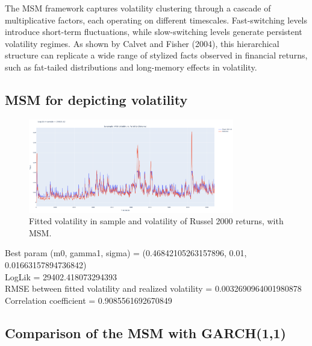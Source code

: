 \documentclass[11pt]{extarticle}
\begin{document}
The MSM framework captures volatility clustering through a cascade of multiplicative factors, each operating on different timescales. Fast-switching levels introduce short-term fluctuations, while slow-switching levels generate persistent volatility regimes. As shown by Calvet and Fisher (2004), this hierarchical structure can replicate a wide range of stylized facts observed in financial returns, such as fat-tailed distributions and long-memory effects in volatility.





\subsection{MSM for depicting volatility}

\begin{figure}[!ht]
    \centering
    \includegraphics[width=0.8\textwidth]{img/msm_vol}
    \caption{Fitted volatility in sample and volatility of Russel 2000 returns, with MSM.}
    \label{fig:msm_fitted_vol}
\end{figure}

\FloatBarrier

Best param (m0, gamma1, sigma) = (0.46842105263157896, 0.01, 0.01663157894736842) \\

LogLik = 29402.418073294393 \\

RMSE between fitted volatility and realized volatility = 0.0032690964001980878 \\

Correlation coefficient = 0.9085561692670849 \\



\subsection{Comparison of the MSM with GARCH(1,1)}
\end{document}
